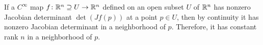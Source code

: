 \documentclass[letterpaper, 11pt, oneside]{book}
\begin{document}
If a $C^{\infty}$ map $f\colon \mathbb{R}^{n} \supseteq U \to \mathbb{R}^{n}$ defined on an open subset $U$ of $\mathbb{R}^{n}$ has nonzero Jacobian determinant $\det(Jf(p))$ at a point $p \in U$, then by continuity it has nonzero Jacobian determinant in a neighborhood of $p$.
Therefore, it has constant rank $n$ in a neighborhood of $p$.

\clearpage
\nocite{book:TuAITM}
\nocite{note:conrad_topologist_sine}
\nocite{note:compactness_review}
\nocite{book:Rudin_RCA}
\nocite{book:Steen_Seebach}
\nocite{book:Munkres}
\nocite{book:Lee_ITM}
\nocite{book:hatcher_AT}
\printbibliography
\end{document}
